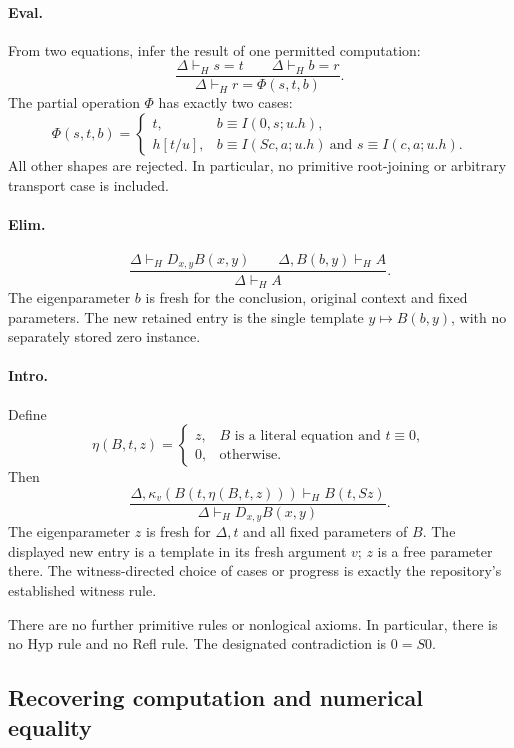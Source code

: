\documentclass[11pt]{article}
\theoremstyle{definition}\newtheorem{definition}[theorem]{Definition}
\theoremstyle{remark}\newtheorem{remark}[theorem]{Remark}
\begin{document}
\paragraph{Eval.}
From two equations, infer the result of one permitted computation:
\[
 \frac{\Delta\vdash_H s=t\qquad\Delta\vdash_H b=r}
      {\Delta\vdash_H r=\Phi(s,t,b)}.
 \tag{Eval}
\]
The partial operation $\Phi$ has exactly two cases:
\[
 \Phi(s,t,b)=
 \begin{cases}
 t,&b\equiv I(0,s;u.h),\\
 h[t/u],&b\equiv I(Sc,a;u.h)\ \text{and }s\equiv I(c,a;u.h).
 \end{cases}
\]
All other shapes are rejected.  In particular, no primitive root-joining
or arbitrary transport case is included.

\paragraph{Elim.}
\[
 \frac{\Delta\vdash_H D_{x,y}B(x,y)\qquad
       \Delta,B(b,y)\vdash_H A}
      {\Delta\vdash_H A}.
 \tag{Elim}
\]
The eigenparameter $b$ is fresh for the conclusion, original context and
fixed parameters.  The new retained entry is the single template
$y\mapsto B(b,y)$, with no separately stored zero instance.

\paragraph{Intro.}
Define
\[
 \eta(B,t,z)=
 \begin{cases}
 z,&B\text{ is a literal equation and }t\equiv0,\\
 0,&\text{otherwise}.
 \end{cases}
\]
Then
\[
 \frac{\Delta,\kappa_v(B(t,\eta(B,t,z)))\vdash_H B(t,Sz)}
      {\Delta\vdash_H D_{x,y}B(x,y)}.
 \tag{Intro}
\]
The eigenparameter $z$ is fresh for $\Delta,t$ and all fixed parameters
of $B$.  The displayed new entry is a template in its fresh argument $v$;
$z$ is a free parameter there.  The witness-directed choice of cases or
progress is exactly the repository's established witness rule.

There are no further primitive rules or nonlogical axioms.  In
particular, there is no Hyp rule and no Refl rule.  The designated
contradiction is $0=S0$.

\subsection{Recovering computation and numerical equality}
\end{document}
